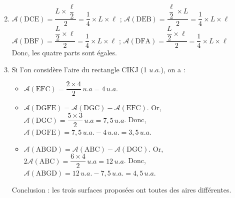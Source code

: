    \begin{minipage}{10.5cm}
      \begin{enumerate}
         \setcounter{enumi}{1}
         \item $\mathcal{A}(\text{DCE}) =\dfrac{L\times\dfrac{\ell}{2}}{2} =\dfrac14\times L\times \ell$ \hspace*{0.5cm} ; \quad $\mathcal{A}(\text{DEB}) =\dfrac{\dfrac{\ell}{2}\times L}{2} =\dfrac14\times L\times \ell$ \\ [1mm]
            $\mathcal{A}(\text{DBF}) =\dfrac{\dfrac{L}{2}\times \ell}{2} =\dfrac14\times L\times \ell$  \hspace*{0.5cm} ; \quad $\mathcal{A}(\text{DFA}) =\dfrac{\dfrac{L}{2}\times \ell}{2} =\dfrac14\times L\times \ell$ \\ [1.5mm]
            Donc, {\blue les quatre parts sont égales.}
      \end{enumerate}
   \end{minipage}
   \begin{enumerate}
   \setcounter{enumi}{2}
      \item Si l'on considère l'aire du rectangle CIKJ (1 $u.a.$), on a :
         \begin{itemize}
            \item $\mathcal{A}(\text{EFC}) =\dfrac{2\times4}{2}\,u.a =4\,u.a.$
            \item $\mathcal{A}(\text{DGFE}) =\mathcal{A}(\text{DGC})-\mathcal{A}(\text{EFC})$. Or, $\mathcal{A}(\text{DGC}) =\dfrac{5\times3}{2}\,u.a =7,5\,u.a$. Donc, $\mathcal{A}(\text{DGFE}) =7,5\,u.a.-4\,u.a. =3,5 \,u.a$.
            \item $\mathcal{A}(\text{ABGD}) =\mathcal{A}(\text{ABC})-\mathcal{A}(\text{DGC})$. Or, $2\mathcal{A}(\text{ABC}) =\dfrac{6\times4}{2} \,u.a =12\,u.a$. Donc, $\mathcal{A}(\text{ABGD}) =12\,u.a.-7,5\,u.a. =4,5\,u.a$.
        \end{itemize}
         Conclusion : {\blue les trois surfaces proposées ont toutes des aires différentes.}
   \end{enumerate}
